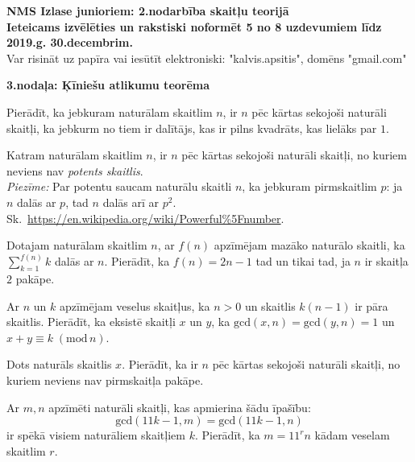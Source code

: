 \documentclass[11pt]{article}
\begin{document}
\begin{center}
{\Large \bf NMS Izlase junioriem: 2.nodarbība skaitļu teorijā}\\
{\bf Ieteicams izvēlēties un rakstiski noformēt 
5 no 8 uzdevumiem līdz 2019.g. 30.decembrim.}\\
{Var risināt uz papīra vai iesūtīt elektroniski: "kalvis.apsitis", domēns "gmail.com"}
\end{center}

\vspace{10pt}
{\bf \large 3.nodaļa: Ķīniešu atlikumu teorēma}

\begin{problem}
Pierādīt, ka jebkuram naturālam skaitlim $n$, ir $n$ pēc kārtas sekojoši 
naturāli skaitļi, ka jebkurm no tiem ir dalītājs, kas ir pilns kvadrāts, kas lielāks par $1$. 
\end{problem}

\begin{problem}
Katram naturālam skaitlim $n$, ir $n$ pēc kārtas sekojoši naturāli skaitļi, no kuriem neviens
nav {\em potents skaitlis}.\\
{\em Piezīme:} Par potentu saucam naturālu skaitli $n$, ka jebkuram pirmskaitlim $p$: ja $n$ dalās 
ar $p$, tad $n$ dalās arī ar $p^2$. Sk.\ \url{https://en.wikipedia.org/wiki/Powerful\%5Fnumber}.
\end{problem}

\begin{problem}
Dotajam naturālam skaitlim $n$, ar $f(n)$ apzīmējam mazāko naturālo skaitli, ka 
${\displaystyle \sum\limits_{k=1}^{f(n)} k}$ dalās ar $n$. 
Pierādīt, ka $f(n) = 2n-1$ tad un tikai tad, ja $n$ ir skaitļa $2$ pakāpe.
\end{problem}

\begin{problem}
Ar $n$ un $k$ apzīmējam veselus skaitļus, ka $n>0$ un skaitlis $k(n-1)$ ir pāra skaitlis. 
Pierādīt, ka eksistē skaitļi $x$ un $y$, ka $\text{gcd}(x,n) = \text{gcd}(y,n) = 1$ un 
$x + y \equiv k\;(\text{mod}\,n)$. 
\end{problem}

\begin{problem}
Dots naturāls skaitlis $x$. Pierādīt, ka ir $n$ pēc kārtas sekojoši naturāli skaitļi, 
no kuriem neviens nav pirmskaitļa pakāpe. 
\end{problem}


\begin{problem}
Ar $m, n$ apzīmēti naturāli skaitļi, kas apmierina šādu īpašību:
$$ \text{gcd}(11k-1,m) = \text{gcd}(11k-1,n)$$
ir spēkā visiem naturāliem skaitļiem $k$. Pierādīt, ka $m = 11^rn$ kādam veselam skaitlim $r$. 
\end{problem}
\end{document}
